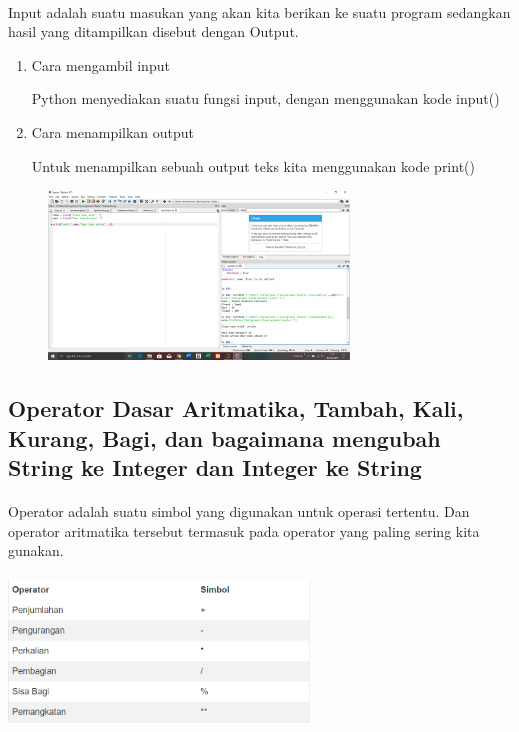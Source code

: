 \documentclass{article}
\begin{document}
\paragraph{} Input adalah suatu masukan yang akan kita berikan ke suatu program sedangkan hasil yang ditampilkan disebut dengan Output.
\begin{enumerate}
    \item Cara mengambil input
        \par Python menyediakan suatu fungsi input, dengan menggunakan kode input() 
    \item Cara menampilkan output
        \par Untuk menampilkan sebuah output teks kita menggunakan kode print()
\end{enumerate}
\begin{figure}[h]
                \centerline{\includegraphics[width=8cm]{figures/inputoutput.png}}
\end{figure}


\subsection{Operator Dasar Aritmatika, Tambah, Kali, Kurang, Bagi, dan bagaimana mengubah String ke Integer dan Integer ke String}
\paragraph{} Operator adalah suatu simbol yang digunakan untuk operasi tertentu. Dan operator aritmatika tersebut termasuk pada operator yang paling sering kita gunakan.
\paragraph{}
    \centerline{\includegraphics[width=8cm]{figures/operatoraritmetika.png}}
\end{document}
